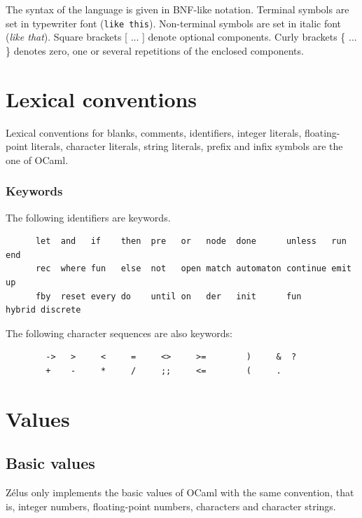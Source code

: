 \documentclass[11pt,titlepage,twoside]{report}
\newcommand{\zelus}{{\sf Z\'elus}}
\newcommand{\ocaml}{{\sf OCaml}}
\newcommand{\term}[1]{{\tt #1}}
\newcommand{\nterm}[1]{{\em #1}}
\begin{document}
The syntax of the language is given in BNF-like notation. Terminal
symbols are set in typewriter font (\term{like this}). Non-terminal symbols
are set in italic font (\nterm{like that}). Square brackets [ ... ] denote
optional components. Curly brackets \{ ... \} denotes zero, one or several
repetitions of the enclosed components.


\section{Lexical conventions\label{lexical}} %

Lexical conventions for blanks, comments, identifiers, integer
literals, floating-point literals, character literals, string
literals, prefix and infix symbols are the one of \ocaml.

\subsubsection{Keywords}
The following identifiers are keywords.

\begin{verbatim}
      let  and   if    then  pre   or   node  done      unless   run    end
      rec  where fun   else  not   open match automaton continue emit   up
      fby  reset every do    until on   der   init      fun      hybrid discrete
\end{verbatim}
The following character sequences are also keywords:

\begin{verbatim}
        ->   >     <     =     <>     >=        )     &  ?
        +    -     *     /     ;;     <=        (     .
\end{verbatim}

\section{Values\label{values}} %
\subsection{Basic values\label{basicvalues}} %

\zelus{} only implements the basic values of \ocaml{} with the same
convention, that is, integer numbers, floating-point numbers,
characters and character strings.
\end{document}
